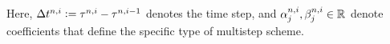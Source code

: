 Here, $\Delta t^{n,i} \vcentcolon= \tau^{n,i} - \tau^{n,i-1}$
denotes the time step, and
$\alpha^{n,i}_j,\beta^{n,i}_j\in\mathbb{R}^{}$ denote coefficients that 
define the specific type of multistep scheme. 

